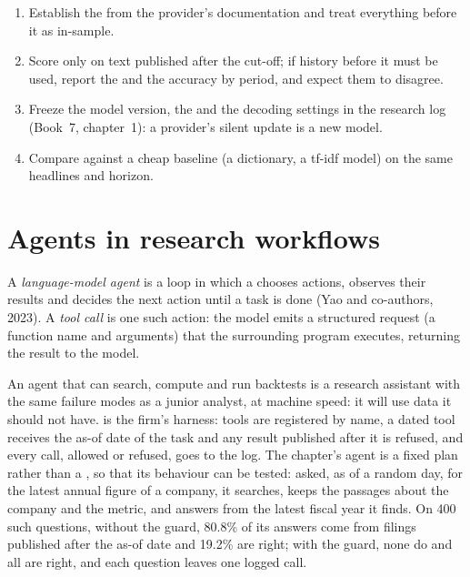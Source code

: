 \begin{method}\label{met:ml:llm:method}
\begin{enumerate}
\item Establish the  from the provider's documentation and treat everything before it as in-sample.
\item Score only on text published after the cut-off; if history before it must be used, report the  and
the accuracy by period, and expect them to disagree.
\item Freeze the model version, the  and the decoding settings in the research log (Book~7, chapter~1): a provider's
silent update is a new model.
\item Compare against a cheap baseline (a dictionary, a tf-idf model) on the same headlines and horizon.
\end{enumerate}
\end{method}

\section{Agents in research workflows}

\begin{definition}\label{def:ml:large-language-models-in-finance:agent}
A \emph{language-model agent} is a loop in which a  chooses actions, observes their
results and decides the next action until a task is done (Yao and co-authors, 2023). A \emph{tool call} is
one such action: the model emits a structured request (a function name and arguments) that the surrounding program executes,
returning the result to the model.
\end{definition}

An agent that can search, compute and run backtests is a research assistant with the same failure modes as a junior analyst,
at machine speed: it will use data it should not have.  is the firm's harness: tools are registered by
name, a dated tool receives the as-of date of the task and any result published after it is refused, and every call,
allowed or refused, goes to the log. The chapter's agent is a fixed plan rather than a , so that its behaviour
can be tested: asked, as of a random day, for the latest annual figure of a company, it searches, keeps the passages about the
company and the metric, and answers from the latest fiscal year it finds. On 400 such questions, without the guard, 80.8\%
of its answers come from filings published after the as-of date and 19.2\% are right; with the guard, none do and all are
right, and each question leaves one logged call.

